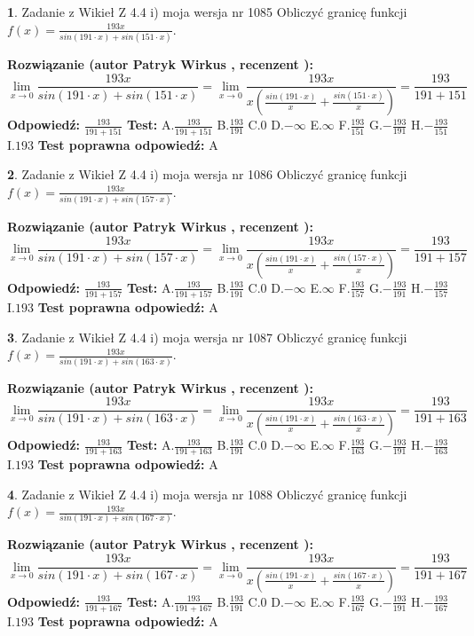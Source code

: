 \documentclass[12pt, a4paper]{article}
\theoremstyle{definition} %
\newtheorem{zad}{}
\newcommand{\zadStart}[1]{\begin{zad}#1\newline}
\newcommand{\zadStop}{\end{zad}}
\newcommand{\rozwStart}[2]{\noindent \textbf{Rozwiązanie (autor #1 , recenzent #2): }\newline}
\newcommand{\rozwStop}{\newline}
\newcommand{\odpStart}{\noindent \textbf{Odpowiedź:}\newline}
\newcommand{\odpStop}{\newline}
\newcommand{\testStart}{\noindent \textbf{Test:}\newline}
\newcommand{\testStop}{\newline}
\newcommand{\kluczStart}{\noindent \textbf{Test poprawna odpowiedź:}\newline}
\newcommand{\kluczStop}{\newline}
\begin{document}
\zadStart{Zadanie z Wikieł Z 4.4 i) moja wersja nr 1085}
Obliczyć granicę funkcji $f(x)=\frac{193x}{sin(191\cdot x) +sin(151\cdot x)}$.
\zadStop
\rozwStart{Patryk Wirkus}{}
$$\lim\limits_{x\to 0}\frac{193x}{sin(191\cdot x) +sin(151\cdot x)}=\lim\limits_{x\to 0}\frac{193x}{x(\frac{sin(191\cdot x)}{x}+\frac{sin(151\cdot x)}{x})}=\frac{193}{191+151}$$
\rozwStop
\odpStart
$\frac{193}{191+151}$
\odpStop
\testStart
A.$\frac{193}{191+151}$
B.$\frac{193}{191}$
C.$0$
D.$-\infty$
E.$\infty$
F.$\frac{193}{151}$
G.$-\frac{193}{191}$
H.$-\frac{193}{151}$
I.$193$
\testStop
\kluczStart
A
\kluczStop



\zadStart{Zadanie z Wikieł Z 4.4 i) moja wersja nr 1086}
Obliczyć granicę funkcji $f(x)=\frac{193x}{sin(191\cdot x) +sin(157\cdot x)}$.
\zadStop
\rozwStart{Patryk Wirkus}{}
$$\lim\limits_{x\to 0}\frac{193x}{sin(191\cdot x) +sin(157\cdot x)}=\lim\limits_{x\to 0}\frac{193x}{x(\frac{sin(191\cdot x)}{x}+\frac{sin(157\cdot x)}{x})}=\frac{193}{191+157}$$
\rozwStop
\odpStart
$\frac{193}{191+157}$
\odpStop
\testStart
A.$\frac{193}{191+157}$
B.$\frac{193}{191}$
C.$0$
D.$-\infty$
E.$\infty$
F.$\frac{193}{157}$
G.$-\frac{193}{191}$
H.$-\frac{193}{157}$
I.$193$
\testStop
\kluczStart
A
\kluczStop



\zadStart{Zadanie z Wikieł Z 4.4 i) moja wersja nr 1087}
Obliczyć granicę funkcji $f(x)=\frac{193x}{sin(191\cdot x) +sin(163\cdot x)}$.
\zadStop
\rozwStart{Patryk Wirkus}{}
$$\lim\limits_{x\to 0}\frac{193x}{sin(191\cdot x) +sin(163\cdot x)}=\lim\limits_{x\to 0}\frac{193x}{x(\frac{sin(191\cdot x)}{x}+\frac{sin(163\cdot x)}{x})}=\frac{193}{191+163}$$
\rozwStop
\odpStart
$\frac{193}{191+163}$
\odpStop
\testStart
A.$\frac{193}{191+163}$
B.$\frac{193}{191}$
C.$0$
D.$-\infty$
E.$\infty$
F.$\frac{193}{163}$
G.$-\frac{193}{191}$
H.$-\frac{193}{163}$
I.$193$
\testStop
\kluczStart
A
\kluczStop



\zadStart{Zadanie z Wikieł Z 4.4 i) moja wersja nr 1088}
Obliczyć granicę funkcji $f(x)=\frac{193x}{sin(191\cdot x) +sin(167\cdot x)}$.
\zadStop
\rozwStart{Patryk Wirkus}{}
$$\lim\limits_{x\to 0}\frac{193x}{sin(191\cdot x) +sin(167\cdot x)}=\lim\limits_{x\to 0}\frac{193x}{x(\frac{sin(191\cdot x)}{x}+\frac{sin(167\cdot x)}{x})}=\frac{193}{191+167}$$
\rozwStop
\odpStart
$\frac{193}{191+167}$
\odpStop
\testStart
A.$\frac{193}{191+167}$
B.$\frac{193}{191}$
C.$0$
D.$-\infty$
E.$\infty$
F.$\frac{193}{167}$
G.$-\frac{193}{191}$
H.$-\frac{193}{167}$
I.$193$
\testStop
\kluczStart
A
\kluczStop
\end{document}
